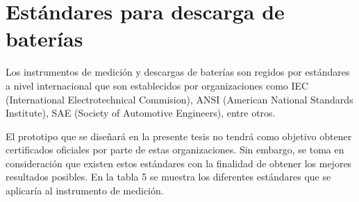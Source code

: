 \section{Estándares para descarga de baterías}

Los instrumentos de medición y descargas de baterías son regidos por estándares a nivel internacional que son establecidos por organizaciones como IEC (International Electrotechnical Commision), ANSI (American National Standards Institute), SAE (Society of Automotive Engineers), entre otros. 

El prototipo que se diseñará en la presente tesis no tendrá como objetivo obtener certificados oficiales por parte de estas organizaciones. Sin embargo, se toma en consideración que existen estos estándares con la finalidad de obtener los mejores resultados posibles. En la tabla 5 se muestra los diferentes estándares que se aplicaría al instrumento de medición. 








